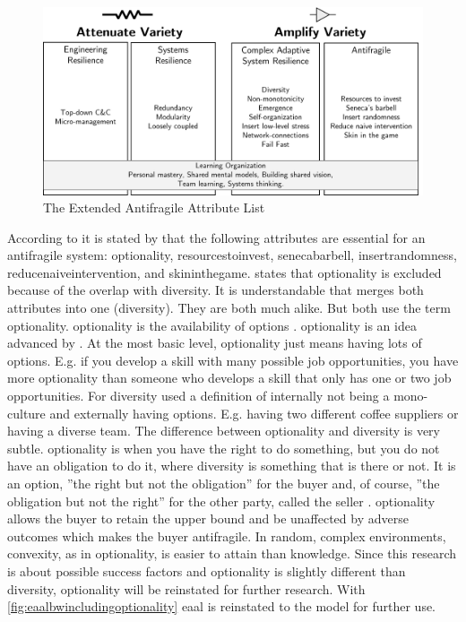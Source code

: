 \begin{figure}[h!]
	\centering
	\includegraphics[width=0.8\linewidth]{images/eaalbw}
	\caption[The Extended Antifragile Attribute List \parencite{Botjes2021}]{The Extended Antifragile Attribute List \parencite{Botjes2021}}
	\label{fig:eaalbw}
\end{figure}
According to \textcite[p.~64]{Botjes2020} it is stated by \textcite{Taleb2008} that the following attributes are essential for an \gls{antifragile} system: \Gls{optionality}, \Gls{resourcestoinvest}, \Gls{senecabarbell}, \Gls{insertrandomness}, \Gls{reducenaiveintervention}, and \Gls{skininthegame}. \textcite[p.~64]{Botjes2020} states that \gls{optionality} is excluded because of the overlap with \gls{diversity}. It is understandable that \textcite[p.~66]{Botjes2020} merges both attributes into one (\gls{diversity}). They are both much alike. But \textcites{Taleb2012}{Gorgeon2015} both use the term \gls{optionality}. \Gls{optionality} is the availability of options \parencites[p.~176--177]{Taleb2012}[p.~9]{Gorgeon2015}. \Gls{optionality} is an idea advanced by \textcite{Taleb2012}. At the most basic level, \gls{optionality} just means having lots of options. E.g. if you develop a skill with many possible job opportunities, you have more \gls{optionality} than someone who develops a skill that only has one or two job opportunities. For \gls{diversity} \textcite{Botjes2020} used a definition of internally not being a mono-culture and externally having options. E.g. having two different coffee suppliers or having a diverse team. The difference between \gls{optionality} and \gls{diversity} is very subtle. \gls{optionality} is when you have the right to do something, but you do not have an obligation to do it, where diversity is something that is there or not. It is an option, ''the right but not the obligation'' for the buyer and, of course, ''the obligation but not the right'' for the other party, called the seller \parencite[p.~174]{Taleb2012}. \Gls{optionality} allows the buyer to retain the upper bound and be unaffected by adverse outcomes which makes the buyer \gls{antifragile}. In random, complex environments, convexity, as in \gls{optionality}, is easier to attain than knowledge. Since this research is about possible success factors and \gls{optionality} is slightly different than \gls{diversity}, \gls{optionality} will be reinstated for further research. With \cref{fig:eaalbwincludingoptionality} \acrlong{eaal} is reinstated to the model for further use.
